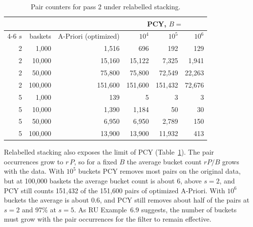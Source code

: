 \begin{table}[ht]
  \centering
  \caption{Pair counters for pass 2 under relabelled stacking.}
  \label{tab:pcy-relabelled}
  \begin{tabular}{rrrrrr}
    \toprule
    & & & \multicolumn{3}{c}{PCY, $B =$} \\
    \cmidrule(lr){4-6}
    $s$ & baskets & A-Priori (optimized) & $10^4$ & $10^5$ & $10^6$ \\
    \midrule
    2 & 1{,}000 & 1{,}516 & 696 & 192 & 129 \\
    2 & 10{,}000 & 15{,}160 & 15{,}122 & 7{,}325 & 1{,}941 \\
    2 & 50{,}000 & 75{,}800 & 75{,}800 & 72{,}549 & 22{,}263 \\
    2 & 100{,}000 & 151{,}600 & 151{,}600 & 151{,}432 & 72{,}676 \\
    \midrule
    5 & 1{,}000 & 139 & 5 & 3 & 3 \\
    5 & 10{,}000 & 1{,}390 & 1{,}184 & 50 & 30 \\
    5 & 50{,}000 & 6{,}950 & 6{,}950 & 2{,}789 & 150 \\
    5 & 100{,}000 & 13{,}900 & 13{,}900 & 11{,}932 & 413 \\
    \bottomrule
  \end{tabular}
\end{table}

Relabelled stacking also exposes the limit of PCY (Table~\ref{tab:pcy-relabelled}). The pair occurrences grow to $r\,P$, so for a fixed $B$ the average bucket count $r P / B$ grows with the data. With $10^5$ buckets PCY removes most pairs on the original data, but at 100{,}000 baskets the average bucket count is about 6, above $s = 2$, and PCY still counts 151{,}432 of the 151{,}600 pairs of optimized A-Priori. With $10^6$ buckets the average is about 0.6, and PCY still removes about half of the pairs at $s = 2$ and 97\% at $s = 5$. As RU Example~6.9 suggests, the number of buckets must grow with the pair occurrences for the filter to remain effective.
